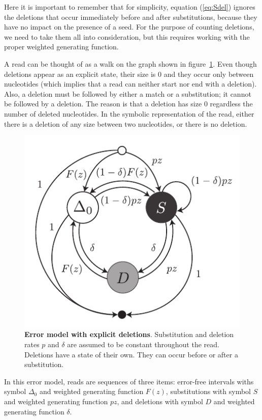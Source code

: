 \documentclass{article}
\begin{document}
Here it is important to remember that for simplicity, equation
(\ref{eq:Sdel}) ignores the deletions that occur immediately before and
after substitutions, because they have no impact on the presence of a
seed. For the purpose of counting deletions, we need to take them all into
consideration, but this requires working with the proper weighted
generating function.

A read can be thought of as a walk on the graph shown in
figure~\ref{fig:deletions2}. Even though deletions appear as an explicit
state, their size is $0$ and they occur only between nucleotides (which
implies that a read can neither start nor end with a deletion). Also, a
deletion must be followed by either a match or a substitution; it cannot
be followed by a deletion. The reason is that a deletion has size $0$
regardless the number of deleted nucleotides. In the symbolic
representation of the read, either there is a deletion of any size between
two nucleotides, or there is no deletion.

\begin{figure}[h]
\centering
\includegraphics[scale=0.9]{deletions2.pdf}
\caption{\textbf{Error model with explicit deletions}. 
Substitution and deletion rates $p$ and $\delta$ are assumed to be
constant throughout the read. Deletions have a state of their own.
They can occur before or after a substitution.}
\label{fig:deletions2}
\end{figure}

In this error model, reads are sequences of three items:
error-free intervals withs symbol $\Delta_0$ and weighted generating
function $F(z)$, substitutions with symbol $S$ and weighted generating
function $pz$, and deletions with symbol $D$ and weighted generating
function $\delta$.
\end{document}

